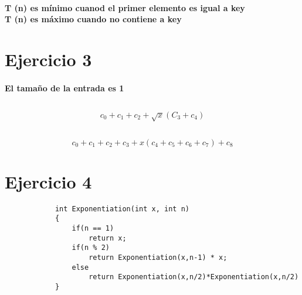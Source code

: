\documentclass[10pt,a4paper]{article}
\begin{document}
            \paragraph{
                T (n) es m\'inimo cuanod el primer elemento es igual a key \\
                T (n) es m\'aximo cuando no contiene a key
                }
    \section{Ejercicio 3}
        \paragraph{
        El tama\~no de la entrada es 1
        }
        \subsection{ }
            \[ c_{0} + c_{1} + c_{2} + \sqrt{x}\left( C_{3} + c_{4}\right) \]
        \subsection{ }
            \[ c_{0} + c_{1} + c_{2} + c_{3} +  x ( c_{4} + c_{5} + c_{6} +c_{7}) + c_{8} \]
            
    \section{Ejercicio 4}
        \begin{lstlisting}
            int Exponentiation(int x, int n)
            {
                if(n == 1) 
                    return x;
                if(n % 2) 
                    return Exponentiation(x,n-1) * x;
                else 
                    return Exponentiation(x,n/2)*Exponentiation(x,n/2)  
            }
        \end{lstlisting}
        
\end{document}
